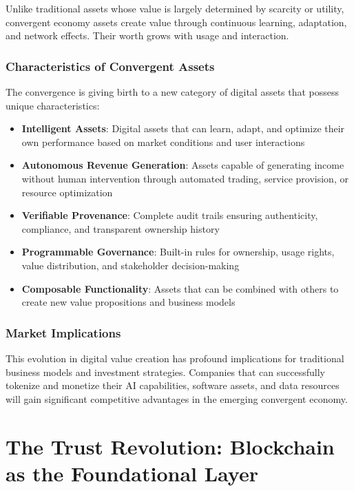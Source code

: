 \documentclass[11pt,a4paper]{report}
\begin{document}
\begin{keypoint}
Unlike traditional assets whose value is largely determined by scarcity or utility, convergent economy assets create value through continuous learning, adaptation, and network effects. Their worth grows with usage and interaction.
\end{keypoint}

\subsection{Characteristics of Convergent Assets}

The convergence is giving birth to a new category of digital assets that possess unique characteristics:

\begin{itemize}
    \item \textbf{Intelligent Assets}: Digital assets that can learn, adapt, and optimize their own performance based on market conditions and user interactions
    \item \textbf{Autonomous Revenue Generation}: Assets capable of generating income without human intervention through automated trading, service provision, or resource optimization
    \item \textbf{Verifiable Provenance}: Complete audit trails ensuring authenticity, compliance, and transparent ownership history
    \item \textbf{Programmable Governance}: Built-in rules for ownership, usage rights, value distribution, and stakeholder decision-making
    \item \textbf{Composable Functionality}: Assets that can be combined with others to create new value propositions and business models
\end{itemize}

\subsection{Market Implications}

This evolution in digital value creation has profound implications for traditional business models and investment strategies. Companies that can successfully tokenize and monetize their AI capabilities, software assets, and data resources will gain significant competitive advantages in the emerging convergent economy.

\chapter{The Trust Revolution: Blockchain as the Foundational Layer}
\end{document}

